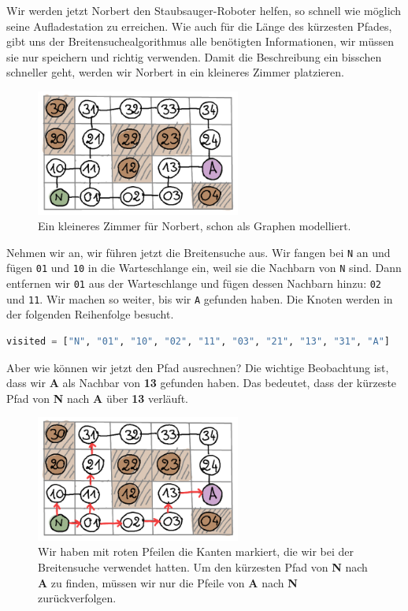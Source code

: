 Wir werden jetzt Norbert den Staubsauger-Roboter helfen, so schnell wie möglich seine Aufladestation zu erreichen. Wie auch für die Länge des kürzesten Pfades, gibt uns der Breitensuchealgorithmus alle benötigten Informationen, wir müssen sie nur speichern und richtig verwenden. Damit die Beschreibung ein bisschen schneller geht, werden wir Norbert in ein kleineres Zimmer platzieren.
\begin{figure}[H]
    \centering
    \includegraphics[width=0.6\textwidth]{Pictures/SP/norbert_klein_graph.png}
    \caption{Ein kleineres Zimmer für Norbert, schon als Graphen modelliert.}
    \label{fig:norbert_klein_graph}
\end{figure}
Nehmen wir an, wir führen jetzt die Breitensuche aus. Wir fangen bei \texttt{N} an und fügen \texttt{01} und \texttt{10} in die Warteschlange ein, weil sie die Nachbarn von \texttt{N} sind. Dann entfernen wir \texttt{01} aus der Warteschlange und fügen dessen Nachbarn hinzu: \texttt{02} und \texttt{11}. Wir machen so weiter, bis wir \texttt{A} gefunden haben.  Die Knoten werden in der folgenden Reihenfolge besucht.
\begin{lstlisting}[language=Python]
visited = ["N", "01", "10", "02", "11", "03", "21", "13", "31", "A"]
\end{lstlisting}
Aber wie können wir jetzt den Pfad ausrechnen?
Die wichtige Beobachtung ist, dass wir \textbf{A} als Nachbar von \textbf{13} gefunden haben. Das bedeutet, dass der kürzeste Pfad von \textbf{N} nach \textbf{A} über \textbf{13} verläuft.
\begin{figure}[H]
    \centering
    \includegraphics[width=0.6\textwidth]{Pictures/SP/norbert_klein_graph_arrows.png}
    \caption{Wir haben mit roten Pfeilen die Kanten markiert, die wir bei der Breitensuche verwendet hatten. Um den kürzesten Pfad von \textbf{N} nach \textbf{A} zu finden, müssen wir nur die Pfeile von \textbf{A} nach \textbf{N} zurückverfolgen.}
    \label{fig:norbert_klein_graph_arrows}
\end{figure}
